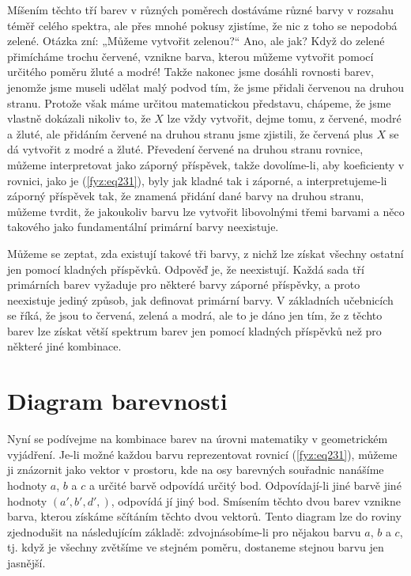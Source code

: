    Míšením těchto tří barev v různých poměrech dostáváme různé barvy v rozsahu téměř celého 
    spektra, ale přes mnohé pokusy zjistíme, že nic z toho se nepodobá zelené. Otázka zní: „Můžeme 
    vytvořit zelenou?“ Ano, ale jak? Když do zelené přimícháme trochu červené, vznikne barva, 
    kterou můžeme vytvořit pomocí určitého poměru žluté a modré! Takže nakonec jsme dosáhli 
    rovnosti barev, jenomže jsme museli udělat malý podvod tím, že jsme přidali červenou na druhou 
    stranu. Protože však máme určitou matematickou představu, chápeme, že jsme vlastně dokázali 
    nikoliv to, že \(X\) lze vždy vytvořit, dejme tomu, z červené, modré a žluté, ale přidáním 
    červené na druhou stranu jsme zjistili, že červená plus \(X\) se dá vytvořit z modré a žluté. 
    Převedení červené na druhou stranu rovnice, můžeme interpretovat jako záporný příspěvek, takže 
    dovolíme-li, aby koeficienty v rovnici, jako je (\ref{fyz:eq231}), byly jak kladné tak i 
    záporné, a interpretujeme-li záporný příspěvek tak, že znamená přidání dané barvy na druhou 
    stranu, můžeme tvrdit, že jakoukoliv barvu lze vytvořit libovolnými třemi barvami a něco 
    takového jako fundamentální primární barvy neexistuje.
    
    Můžeme se zeptat, zda existují takové tři barvy, z nichž lze získat všechny ostatní jen pomocí 
    kladných příspěvků. Odpověď je, že neexistují. Každá sada tří primárních barev vyžaduje pro 
    některé barvy záporné příspěvky, a proto neexistuje jediný způsob, jak definovat primární barvy.
    V základních učebnicích se říká, že jsou to červená, zelená a modrá, ale to je dáno jen tím, že 
    z těchto barev lze získat větší spektrum barev jen pomocí kladných příspěvků než pro některé 
    jiné kombinace.
    
  \section{Diagram barevnosti}\label{fyz:IchapXXXVsecIV}
    Nyní se podívejme na kombinace barev na úrovni matematiky v geometrickém vyjádření. Je-li možné 
    každou barvu reprezentovat rovnicí (\ref{fyz:eq231}), můžeme ji znázornit jako vektor v 
    prostoru, kde na osy barevných souřadnic nanášíme hodnoty \(a\), \(b\) a \(c\) a určité barvě 
    odpovídá určitý bod. Odpovídají-li jiné barvě jiné hodnoty \((a', b', d',)\), odpovídá jí jiný 
    bod. Smísením těchto dvou barev vznikne barva, kterou získáme sčítáním těchto dvou vektorů. 
    Tento diagram lze do roviny zjednodušit na následujícím základě: zdvojnásobíme-li pro nějakou 
    barvu \(a\), \(b\) a \(c\), tj. když je všechny zvětšíme ve stejném poměru, dostaneme stejnou 
    barvu jen jasnější.
    
